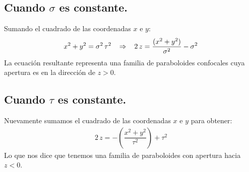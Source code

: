 \subsection{Cuando $\sigma$ es constante.}
Sumando el cuadrado de las coordenadas $x$ e $y$:
\begin{align*}
x^{2} + y^{2} = \sigma^{2} \, \tau^{2} \hspace{0.3cm} \Rightarrow \hspace{0.3cm} 2 \, z = \dfrac{(x^{2} + y^{2})}{\sigma^{2}} - \sigma^{2}
\end{align*}
La ecuación resultante representa una familia de paraboloides confocales cuya apertura es en la dirección de $z > 0$.
\subsection{Cuando $\tau$ es constante.}
Nuevamente sumamos el cuadrado de las coordenadas $x$ e $y$ para obtener:
\begin{align*}
2 \, z = - \left( \dfrac{x^{2} + y^{2}}{\tau^{2}}\right) + \tau^{2}
\end{align*}
Lo que nos dice que tenemos una familia de paraboloides con apertura hacia $z < 0$.
